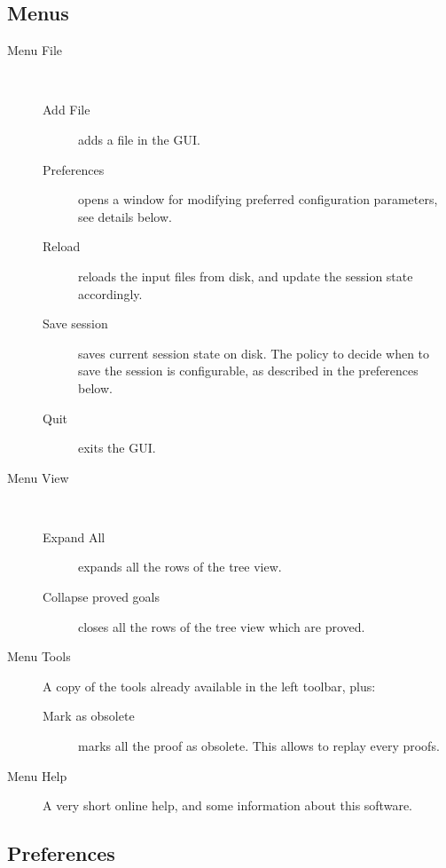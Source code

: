 \subsection{Menus}

\begin{description}
\item[Menu \textsf{File}]~
\begin{description}
\item[Add File] adds a file in the GUI.
\item[Preferences] opens a window for modifying preferred
  configuration parameters, see details below.
\item[Reload] reloads the input files from disk, and update the session state accordingly.
\item[Save session] saves current session state on disk. The policy to decide when to save the session is configurable, as described in the preferences below.
\item[Quit] exits the GUI.
\end{description}

\item[Menu \textsf{View}]~
\begin{description}
\item[Expand All] expands all the rows of the tree view.
\item[Collapse proved goals] closes all the rows of the tree view
  which are proved.
\end{description}

\item[Menu \textsf{Tools}]
A copy of the tools already available in the left toolbar, plus:
\begin{description}
\item[Mark as obsolete] marks all the proof as obsolete. This allows to
  replay every proofs.
\end{description}

\item[Menu \textsf{Help}]
A very short online help, and some information about this software.
\end{description}

\subsection{Preferences}

